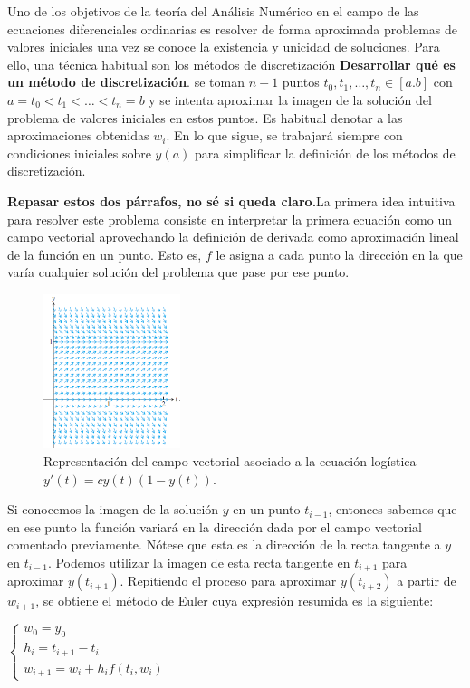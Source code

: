 \documentclass{article}
\theoremstyle{theorem-style}  %
\theoremstyle{definition}
\theoremstyle{example-style}
\begin{document}
	Uno de los objetivos de la teoría del Análisis Numérico en el campo de las ecuaciones diferenciales ordinarias es resolver de forma aproximada problemas de valores iniciales una vez se conoce la existencia y unicidad de soluciones. Para ello, una técnica habitual son los métodos de discretización \textbf{Desarrollar qué es un método de discretización}.  se toman $n+1$ puntos $t_0, t_1, \ldots, t_n \in [a.b]$ con $a = t_0 < t_1 < \ldots < t_n = b$ y se intenta aproximar la imagen de la solución del problema de valores iniciales en estos puntos. Es habitual denotar a las aproximaciones obtenidas $w_i$. En lo que sigue, se trabajará siempre con condiciones iniciales sobre $y(a)$ para simplificar la definición de los métodos de discretización. 	
	
	\textbf{Repasar estos dos párrafos, no sé si queda claro.}La primera idea intuitiva para resolver este problema consiste en interpretar la primera ecuación como un campo vectorial aprovechando la definición de derivada como aproximación lineal de la función en un punto. Esto es, $f$ le asigna a cada punto la dirección en la que varía cualquier solución del problema que pase por ese punto.

	\begin{figure}[h]
		\centering
		\includegraphics[width=4cm]{./Images/interpret-pvi.png}
		\caption{Representación del campo vectorial asociado a la ecuación logística $y'(t) = c y(t) (1 - y(t))$.} 
		\label{fig:interpret-pvi}
	\end{figure}

	Si conocemos la imagen de la solución $y$ en un punto $t_{i-1}$, entonces sabemos que en ese punto la función variará en la dirección dada por el campo vectorial comentado previamente. Nótese que esta es la dirección de la recta tangente a $y$ en $t_{i-1}$. Podemos utilizar la imagen de esta recta tangente en $t_{i+1}$ para aproximar $y(t_{i+1})$. Repitiendo el proceso para aproximar $y(t_{i+2})$ a partir de $w_{i+1}$, se obtiene el método de Euler cuya expresión resumida es la siguiente:

	\begin{center}
		$\begin{cases}
		w_0=y_0 \\
		h_{i} = t_{i+1} - t_i \\
		w_{i+1} = w_i + h_{i} f(t_i,w_i)
		\end{cases}$
	\end{center}
	
\end{document}
